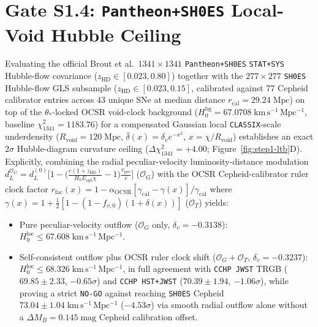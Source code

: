\documentclass[11pt,a4paper]{article}
\begin{document}
\section{\texorpdfstring{Gate S1.4: \texttt{Pantheon+SH0ES} Local-Void Hubble Ceiling}{Gate S1.4: Pantheon+SH0ES Local-Void Hubble Ceiling}}
Evaluating the official Brout et al.\ $1341\times 1341$ \texttt{Pantheon+SH0ES} \texttt{STAT+SYS} Hubble-flow covariance ($z_{\mathrm{HD}} \in [0.023, 0.80]$) together with the $277\times 277$ \texttt{SH0ES} Hubble-flow GLS subsample ($z_{\mathrm{HD}} \in [0.023, 0.15]$, calibrated against 77 Cepheid calibrator entries across 43 unique SNe at median distance $r_{\mathrm{cal}} = 29.24\;\mathrm{Mpc}$) on top of the $\theta_*$-locked OCSR void-clock background ($H_0^{\mathrm{bg}} = 67.0708\;\mathrm{km\,s^{-1}\,Mpc^{-1}}$, baseline $\chi^2_{1341} = 1183.76$) for a compensated Gaussian local \texttt{CLASSIX}-scale underdensity ($R_{\mathrm{void}} = 120\;\mathrm{Mpc}$, $\bar{\delta}(x) = \delta_v e^{-x^2}$, $x = \chi/R_{\mathrm{void}}$) establishes an exact $2\sigma$ Hubble-diagram curvature ceiling ($\Delta\chi^2_{1341} = +4.00$; Figure~\ref{fig:step1-ltb}D). Explicitly, combining the radial peculiar-velocity luminosity-distance modulation $d_L^{\mathcal{O}_G} = d_L^{(0)}\bigl[1 - \bigl(\frac{c(1+z_{\mathrm{HD}})}{H_0 E_{\mathrm{opt}}\chi} - 1\bigr)\frac{v_{\mathrm{pec}}}{c}\bigr]$ ($\mathcal{O}_G$) with the OCSR Cepheid-calibrator ruler clock factor $r_{\mathrm{fac}}(x) = 1 - \alpha_{\mathrm{OCSR}}[\gamma_{\mathrm{cal}} - \gamma(x)]/\gamma_{\mathrm{cal}}$ where $\gamma(x) = 1 + \frac{1}{2}[1 - (1 - f_{v,0})(1 + \delta(x))]$ ($\mathcal{O}_T$) yields:
\begin{itemize}
    \item Pure peculiar-velocity outflow ($\mathcal{O}_G$ only, $\delta_v = -0.3138$): $H_0^{\mathrm{loc}} \le 67.608\;\mathrm{km\,s^{-1}\,Mpc^{-1}}$.
    \item Self-consistent outflow plus OCSR ruler clock shift ($\mathcal{O}_G + \mathcal{O}_T$, $\delta_v = -0.3237$): $H_0^{\mathrm{loc}} \le \mathbf{68.326\;\mathrm{km\,s^{-1}\,Mpc^{-1}}}$, in full agreement with \texttt{CCHP JWST} TRGB ($69.85 \pm 2.33$, $-0.65\sigma$) and \texttt{CCHP HST+JWST} ($70.39 \pm 1.94$, $-1.06\sigma$), while proving a strict \texttt{NO-GO} against reaching \texttt{SH0ES} Cepheid $73.04 \pm 1.04\;\mathrm{km\,s^{-1}\,Mpc^{-1}}$ ($-4.53\sigma$) via smooth radial outflow alone without a $\Delta M_B = 0.145\;\mathrm{mag}$ Cepheid calibration offset.
\end{itemize}
\end{document}
